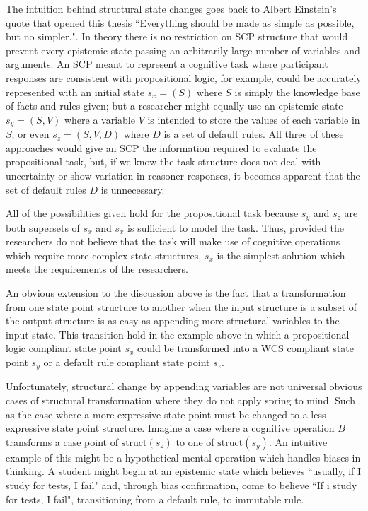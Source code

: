 {The intuition behind structural state changes goes back to Albert Einstein's quote that opened this thesis ``Everything should be made as simple as possible, but no simpler.". In theory there is no restriction on SCP structure that would prevent every epistemic state passing an arbitrarily large number of variables and arguments. An SCP meant to represent a cognitive task where participant responses are consistent with propositional logic, for example, could be accurately represented with an initial state $s_x=(S)$ where $S$ is simply the knowledge base of facts and rules given; but a researcher might equally use an epistemic state $s_y=(S,V)$ where a variable $V$ is intended to store the values of each variable in $S$; or even $s_z=(S,V,D)$ where $D$ is a set of default rules. All three of these approaches would give an SCP the information required to evaluate the propositional task, but, if we know the task structure does not deal with uncertainty or show variation in reasoner responses, it becomes apparent that the set of default rules $D$ is unnecessary.

All of the possibilities given hold for the propositional task because $s_y$ and $s_z$ are both supersets of $s_x$ and $s_x$ is sufficient to model the task. Thus, provided the researchers do not believe that the task will make use of cognitive operations which require more complex state structures, $s_x$ is the simplest solution which meets the requirements of the researchers.

An obvious extension to the discussion above is the fact that a transformation from one state point structure to another when the input structure is a subset of the output structure is as easy as appending more structural variables to the input state. This transition hold in the example above in which a propositional logic compliant state point $s_x$ could be transformed into a WCS compliant state point $s_y$ or a default rule compliant state point $s_z$.

Unfortunately, structural change by appending variables are not universal obvious cases of structural transformation where they do not apply spring to mind. Such as the case where a more expressive state point must be changed to a less expressive state point structure. Imagine a case where a cognitive operation $B$ transforms a case point of $\textrm{struct}(s_z)$ to one of $\textrm{struct}(s_y)$. An intuitive example of this might be a hypothetical mental operation which handles biases in thinking. A student might begin at an epistemic state which believes ``usually, if I study for tests, I fail" and, through bias confirmation, come to believe ``If i study for tests, I fail", transitioning from a default rule, to immutable rule. 

}
